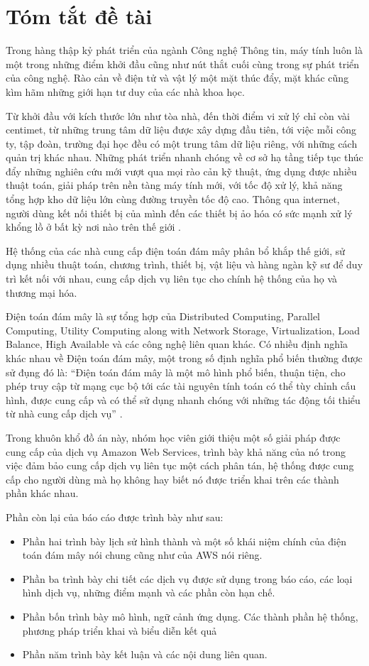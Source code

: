 \section{Tóm tắt đề tài}
\label{summary}

Trong hàng thập kỷ phát triển của ngành Công nghệ Thông tin, máy tính luôn là một trong những điểm khởi đầu cũng như nút thắt cuối cùng trong sự phát triển của công nghệ. Rào cản về điện tử và vật lý một mặt thúc đẩy, mặt khác cũng kìm hãm những giới hạn tư duy của các nhà khoa học.

Từ khởi đầu với kích thước lớn như tòa nhà, đến thời điểm vi xử lý chỉ còn vài centimet, từ những trung tâm dữ liệu được xây dựng đầu tiên, tới việc mỗi công ty, tập đoàn, trường đại học đều có một trung tâm dữ liệu riêng, với những cách quản trị khác nhau. Những phát triển nhanh chóng về cơ sở hạ tầng tiếp tục thúc đẩy những nghiên cứu mới vượt qua mọi rào cản kỹ thuật, ứng dụng được nhiều thuật toán, giải pháp trên nền tàng máy tính mới, với tốc độ xử lý, khả năng tổng hợp kho dữ liệu lớn cùng đường truyền tốc độ cao. Thông qua internet, người dùng kết nối thiết bị của mình đến các thiết bị ảo hóa có sức mạnh xử lý khổng lồ ở bất kỳ nơi nào trên thế giới \cite{furht2010handbook}.

Hệ thống của các nhà cung cấp điện toán đám mây phân bổ khắp thế giới, sử dụng nhiều thuật toán, chương trình, thiết bị, vật liệu và hàng ngàn kỹ sư để duy trì kết nối với nhau, cung cấp dịch vụ liên tục cho chính hệ thống của họ và thương mại hóa.

Điện toán đám mây là sự tổng hợp của Distributed Computing, Parallel Computing, Utility Computing along with Network Storage, Virtualization, Load Balance, High Available và các công nghệ liên quan khác. Có nhiều định nghĩa khác nhau về Điện toán đám mây, một trong số định nghĩa phổ biến thường được sử đụng đó là: “Điện toán đám mây là một mô hình phổ biến, thuận tiện, cho phép truy cập từ mạng cục bộ tới các tài nguyên tính toán có thể tùy chỉnh cấu hình, được cung cấp và có thể sử dụng nhanh chóng với những tác động tối thiểu từ nhà cung cấp dịch vụ” \cite{mell2011nist}.

Trong khuôn khổ đồ án này, nhóm học viên giới thiệu một số giải pháp được cung cấp của dịch vụ Amazon Web Services, trình bày khả năng của nó trong việc đảm bảo cung cấp dịch vụ liên tục một cách phân tán, hệ thống được cung cấp cho người dùng mà họ không hay biết nó được triển khai trên các thành phần khác nhau. 

Phần còn lại của báo cáo được trình bày như sau:
\begin{itemize}
    \item Phần hai trình bày lịch sử hình thành và một số khái niệm chính của điện toán đám mây nói chung cũng như của AWS nói riêng.
    \item Phần ba trình bày chi tiết các dịch vụ được sử dụng trong báo cáo, các loại hình dịch vụ, những điểm mạnh và các phần còn hạn chế.
    \item Phần bốn trình bày mô hình, ngữ cảnh ứng dụng. Các thành phần hệ thống, phương pháp triển khai và biểu diễn kết quả
    \item Phần năm trình bày kết luận và các nội dung liên quan.
\end{itemize}